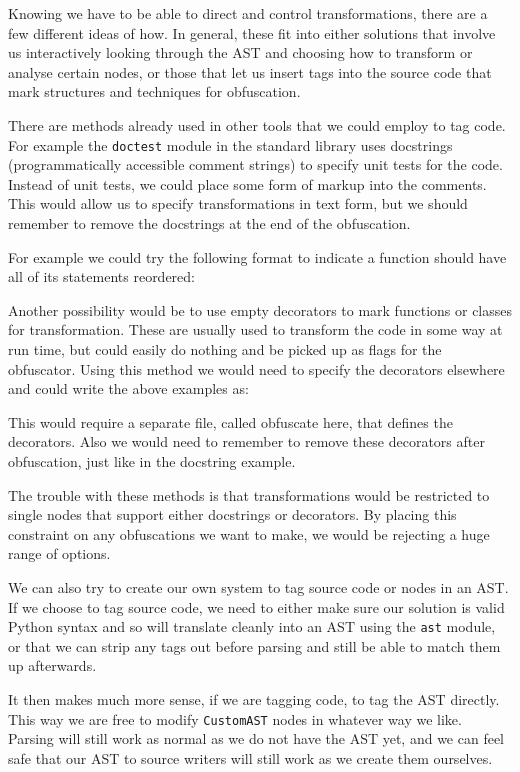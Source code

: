 \documentclass{report}
\begin{document}
Knowing we have to be able to direct and control transformations, there are a few different ideas of how. In general, these fit into
either solutions that involve us interactively looking through the AST and choosing how to transform or analyse certain
nodes, or those that let us insert tags into the source code that mark structures and techniques for obfuscation.

There are methods already used in other tools that we could employ to tag code. For example the \texttt{doctest} module in the standard
library uses docstrings (programmatically accessible comment strings) to specify unit tests for the code. Instead of unit tests,
we could place some form of markup into the comments. This would allow us to specify transformations in text form, but we should
remember to remove the docstrings at the end of the obfuscation.

For example we could try the following format to indicate a function should have all of its statements reordered:



Another possibility would be to use empty decorators to mark functions or classes for transformation. These are usually used to
transform the code in some way at run time, but could easily do nothing and be picked up as flags for the obfuscator. Using this
method we would need to specify the decorators elsewhere and could write the above examples as:



This would require a separate file, called obfuscate here, that defines the decorators. Also we would need to remember to
remove these decorators after obfuscation, just like in the docstring example.

The trouble with these methods is that transformations would be restricted to single nodes that support either docstrings or
decorators. By placing this constraint on any obfuscations we want to make, we would be rejecting a huge range of options.

We can also try to create our own system to tag source code or nodes in an AST. If we choose to tag source code, we need
to either make sure our solution is valid Python syntax and so will translate cleanly into an AST using the \texttt{ast}
module, or that we can strip any tags out before parsing and still be able to match them up afterwards.

It then makes much more sense, if we are tagging code, to tag the AST directly. This way we are free to modify \texttt{CustomAST}
nodes in whatever way we like. Parsing will still work as normal as we do not have the AST yet, and we can feel safe that our AST
to source writers will still work as we create them ourselves.
\end{document}
